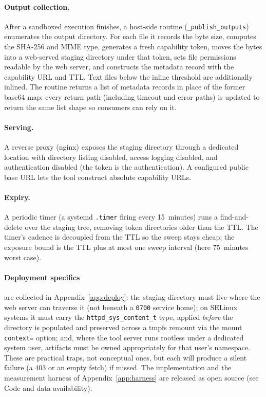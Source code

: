 \documentclass[11pt]{article}
\begin{document}
\paragraph{Output collection.} After a sandboxed execution finishes, a host-side routine (\texttt{\_publish\_outputs}) enumerates the output directory. For each file it records the byte size, computes the SHA-256 and MIME type, generates a fresh capability token, moves the bytes into a web-served staging directory under that token, sets file permissions readable by the web server, and constructs the metadata record with the capability URL and TTL. Text files below the inline threshold are additionally inlined. The routine returns a list of metadata records in place of the former base64 map; every return path (including timeout and error paths) is updated to return the same list shape so consumers can rely on it.

\paragraph{Serving.} A reverse proxy (nginx) exposes the staging directory through a dedicated location with directory listing disabled, access logging disabled, and authentication disabled (the token is the authentication). A configured public base URL lets the tool construct absolute capability URLs.

\paragraph{Expiry.} A periodic timer (a systemd \texttt{.timer} firing every 15~minutes) runs a find-and-delete over the staging tree, removing token directories older than the TTL. The timer's cadence is decoupled from the TTL so the sweep stays cheap; the exposure bound is the TTL plus at most one sweep interval (here 75~minutes worst case).

\paragraph{Deployment specifics} are collected in Appendix~\ref{app:deploy}: the staging directory must live where the web server can traverse it (not beneath a \texttt{0700} service home); on SELinux systems it must carry the \texttt{httpd\_sys\_content\_t} type, applied \emph{before} the directory is populated and preserved across a tmpfs remount via the mount \texttt{context=} option; and, where the tool server runs rootless under a dedicated system user, artifacts must be owned appropriately for that user's namespace. These are practical traps, not conceptual ones, but each will produce a silent failure (a 403 or an empty fetch) if missed. The implementation and the measurement harness of Appendix~\ref{app:harness} are released as open source (see Code and data availability).
\end{document}
